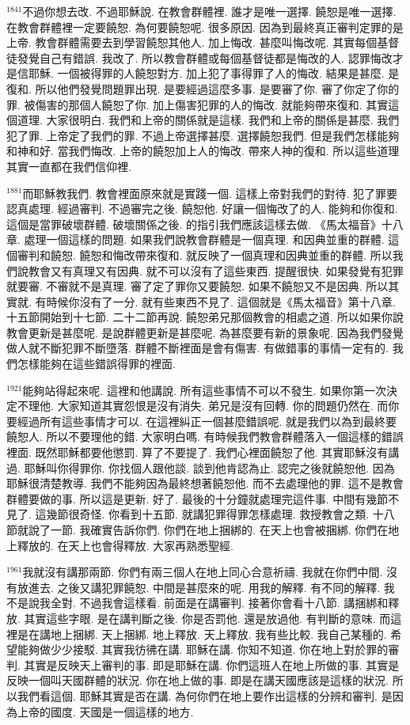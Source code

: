 \documentclass{book}
\begin{document}
$^{1841}$不過你想去改.
不過耶穌說.
在教會群體裡.
誰才是唯一選擇.
饒恕是唯一選擇.
在教會群體裡一定要饒恕.
為何要饒恕呢.
很多原因.
因為到最終真正審判定罪的是上帝.
教會群體需要去到學習饒恕其他人.
加上悔改.
甚麼叫悔改呢.
其實每個基督徒發覺自己有錯誤.
我改了.
所以教會群體或每個基督徒都是悔改的人.
認罪悔改才是信耶穌.
一個被得罪的人饒恕對方.
加上犯了事得罪了人的悔改.
結果是甚麼.
是復和.
所以他們發覺問題罪出現.
是要經過這麼多事.
是要審了你.
審了你定了你的罪.
被傷害的那個人饒恕了你.
加上傷害犯罪的人的悔改.
就能夠帶來復和.
其實這個道理.
大家很明白.
我們和上帝的關係就是這樣.
我們和上帝的關係是甚麼.
我們犯了罪.
上帝定了我們的罪.
不過上帝選擇甚麼.
選擇饒恕我們.
但是我們怎樣能夠和神和好.
當我們悔改.
上帝的饒恕加上人的悔改.
帶來人神的復和.
所以這些道理其實一直都在我們信仰裡.

$^{1881}$而耶穌教我們.
教會裡面原來就是實踐一個.
這樣上帝對我們的對待.
犯了罪要認真處理.
經過審判.
不過審完之後.
饒恕他.
好讓一個悔改了的人.
能夠和你復和.
這個是當罪破壞群體.
破壞關係之後.
的指引我們應該這樣去做.
《馬太福音》十八章.
處理一個這樣的問題.
如果我們說教會群體是一個真理.
和因典並重的群體.
這個審判和饒恕.
饒恕和悔改帶來復和.
就反映了一個真理和因典並重的群體.
所以我們說教會又有真理又有因典.
就不可以沒有了這些東西.
提醒很快.
如果發覺有犯罪就要審.
不審就不是真理.
審了定了罪你又要饒恕.
如果不饒恕又不是因典.
所以其實就.
有時候你沒有了一分.
就有些東西不見了.
這個就是《馬太福音》第十八章.
十五節開始到十七節.
二十二節再說.
饒恕弟兄那個教會的相處之道.
所以如果你說教會更新是甚麼呢.
是說群體更新是甚麼呢.
為甚麼要有新的景象呢.
因為我們發覺做人就不斷犯罪不斷墮落.
群體不斷裡面是會有傷害.
有做錯事的事情一定有的.
我們怎樣能夠在這些錯誤得罪的裡面.

$^{1921}$能夠站得起來呢.
這裡和他講說.
所有這些事情不可以不發生.
如果你第一次決定不理他.
大家知道其實怨恨是沒有消失.
弟兄是沒有回轉.
你的問題仍然在.
而你要經過所有這些事情才可以.
在這裡糾正一個甚麼錯誤呢.
就是我們以為到最終要饒恕人.
所以不要理他的錯.
大家明白嗎.
有時候我們教會群體落入一個這樣的錯誤裡面.
既然耶穌都要他懲罰.
算了不要提了.
我們心裡面饒恕了他.
其實耶穌沒有講過.
耶穌叫你得罪你.
你找個人跟他談.
談到他肯認為止.
認完之後就饒恕他.
因為耶穌很清楚教導.
我們不能夠因為最終想著饒恕他.
而不去處理他的罪.
這不是教會群體要做的事.
所以這是更新.
好了.
最後的十分鐘就處理完這件事.
中間有幾節不見了.
這幾節很奇怪.
你看到十五節.
就講犯罪得罪怎樣處理.
救授教會之類.
十八節就說了一節.
我確實告訴你們.
你們在地上捆綁的.
在天上也會被捆綁.
你們在地上釋放的.
在天上也會得釋放.
大家再熟悉聖經.

$^{1961}$我就沒有講那兩節.
你們有兩三個人在地上同心合意祈禱.
我就在你們中間.
沒有放進去.
之後又講犯罪饒恕.
中間是甚麼來的呢.
用我的解釋.
有不同的解釋.
我不是說我全對.
不過我會這樣看.
前面是在講審判.
接著你會看十八節.
講捆綁和釋放.
其實這些字眼.
是在講判斷之後.
你是否罰他.
還是放過他.
有判斷的意味.
而這裡是在講地上捆綁.
天上捆綁.
地上釋放.
天上釋放.
我有些比較.
我自己某種的.
希望能夠做少少接駁.
其實我彷彿在講.
耶穌在講.
你知不知道.
你在地上對於罪的審判.
其實是反映天上審判的事.
即是耶穌在講.
你們這班人在地上所做的事.
其實是反映一個叫天國群體的狀況.
你在地上做的事.
即是在講天國應該是這樣的狀況.
所以我們看這個.
耶穌其實是否在講.
為何你們在地上要作出這樣的分辨和審判.
是因為上帝的國度.
天國是一個這樣的地方.
\end{document}
